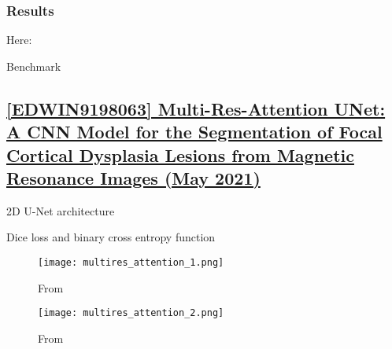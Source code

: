 \subsubsection{Results}

Here: 

\begin{table}[htbp]
	\centering
	\caption{Benchmark}

	\caption{Results from }
	\label{tab:res9}
\end{table}

\newpage
\subsection{\href{https://ieeexplore.ieee.org/document/9198063}{[EDWIN9198063] Multi-Res-Attention UNet: A CNN Model for the Segmentation of Focal Cortical Dysplasia Lesions from Magnetic Resonance Images (May 2021) }}
\label{res10}

2D U-Net architecture

Dice loss and binary cross entropy function

\begin{figure}[htbp]
	\centering
	\texttt{[image: multires\_attention\_1.png]}
	\caption{From }%
	\label{fig:res10_1}
\end{figure}
\begin{figure}[htbp]
	\centering
	\texttt{[image: multires\_attention\_2.png]}
	\caption{From }%
	\label{fig:res10_2}
\end{figure}

